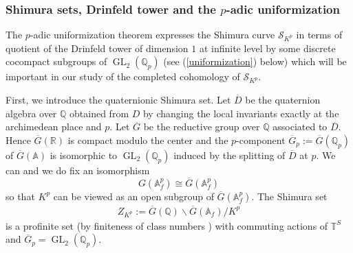 \documentclass{article}
\theoremstyle{definition}
\def\calS{\mathcal{S}}
\def\bbA{\mathbb{A}}
\def\bbQ{\mathbb{Q}}
\def\bbR{\mathbb{R}}
\def\bbT{\mathbb{T}}
\def\bs{\backslash}
\def\isom{\cong}
\DeclareMathOperator{\GL}{GL}
\def\bar{\overline}
\begin{document}
\subsubsection{Shimura sets, Drinfeld tower and the $p$-adic uniformization}\label{sec:uniformization}
The $p$-adic uniformization theorem expresses the Shimura curve $\calS_{K^p}$ in terms of quotient of the Drinfeld tower of dimension $1$ at infinite level by some discrete cocompact subgroups of $\GL_2(\bbQ_p)$ (see (\ref{uniformization}) below) which will be important in our study of the completed cohomology of $\calS_{K^p}$. 

First, we introduce the quaternionic Shimura set. Let $\bar D$ be the quaternion algebra over $\bbQ$ obtained from $D$ by changing the local invariants exactly at the archimedean place and $p$. Let $\bar G$ be the reductive group over $\bbQ$ associated to $\bar D$. Hence $\bar G(\bbR)$ is compact modulo the center and the $p$-component $\bar G_{p}:=\bar G(\bbQ_p)$ of $\bar G(\bbA)$ is isomorphic to $\GL_2(\bbQ_p)$ induced by the splitting of $\bar D$ at $p$. We can and we do fix an isomorphism 
\[G(\bbA_{f}^p)\isom \bar G(\bbA_f^{p})\]
so that $K^p$ can be viewed as an open subgroup of $\bar G(\bbA_f^p)$.  The Shimura set
\begin{align}\label{eq:defofZKp}
    Z_{K^p}:= \bar G (\bbQ)\bs \bar G (\bbA_f)/K^p
\end{align}
is a profinite set (by finiteness of class numbers \cite[Theorem 5.1]{borel1963some}) with commuting actions of $\bbT^S$ and $\bar G_p=\GL_2(\bbQ_p)$.
\end{document}
